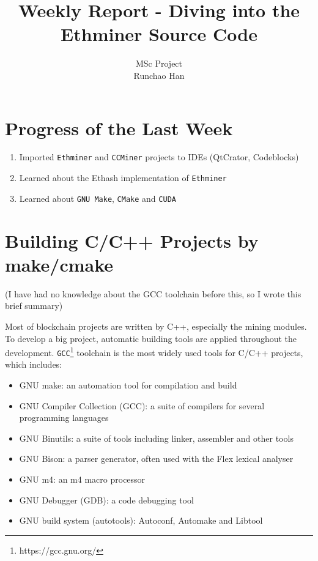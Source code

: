 \documentclass[11pt]{article}
\begin{document}
\title{Weekly Report - Diving into the Ethminer Source Code}
\author{MSc Project \\
Runchao Han \\
}
\maketitle
%
%

\section{Progress of the Last Week}

\begin{enumerate}
\item Imported \texttt{Ethminer} and \texttt{CCMiner} projects to IDEs (QtCrator, Codeblocks)
\item Learned about the Ethash implementation of \texttt{Ethminer} 
\item Learned about \texttt{GNU Make}, \texttt{CMake} and \texttt{CUDA}
\end{enumerate}

\section{Building C/C++ Projects by make/cmake}

(I have had no knowledge about the GCC toolchain before this, so I wrote this brief summary)

Most of blockchain projects are written by C++, especially the mining modules. To develop a big project, automatic building tools are applied throughout the development. \texttt{GCC}\footnote{https://gcc.gnu.org/} toolchain is the most widely used tools for C/C++ projects, which includes:

\begin{itemize}
\item GNU make: an automation tool for compilation and build
\item GNU Compiler Collection (GCC): a suite of compilers for several programming languages
\item GNU Binutils: a suite of tools including linker, assembler and other tools
\item GNU Bison: a parser generator, often used with the Flex lexical analyser
\item GNU m4: an m4 macro processor
\item GNU Debugger (GDB): a code debugging tool
\item GNU build system (autotools): Autoconf, Automake and Libtool
\end{itemize}
\end{document}
